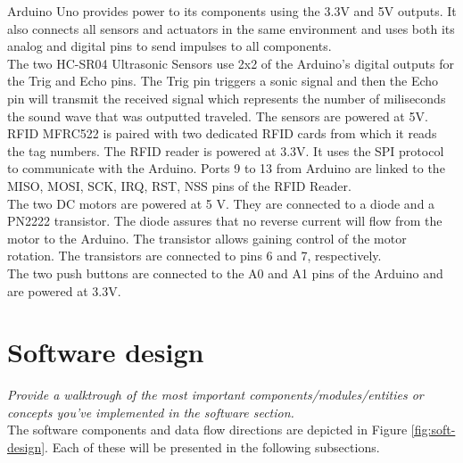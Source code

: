 \documentclass[a4paper,11pt]{article}
\begin{document}
Arduino Uno provides power to its components using the 3.3V and 5V outputs. It also connects all sensors and actuators in the same environment and uses both its analog and digital pins to send impulses to all components.\\

The two HC-SR04 Ultrasonic Sensors use 2x2 of the Arduino's digital outputs for the Trig and Echo pins. The Trig pin triggers a sonic signal and then the Echo pin will transmit the received signal which represents the number of miliseconds the sound wave that was outputted traveled. The sensors are powered at 5V.\\

RFID MFRC522 is paired with two dedicated RFID cards from which it reads the tag numbers. The RFID reader is powered at 3.3V. It uses the SPI protocol to communicate with the Arduino. Ports 9 to 13 from Arduino are linked to the MISO, MOSI, SCK, IRQ, RST, NSS pins of the RFID Reader.\\

The two DC motors are powered at 5 V. They are connected to a diode and a PN2222 transistor. The diode assures that no reverse current will flow from the motor to the Arduino. The transistor allows gaining control of the motor rotation. The transistors are connected to pins 6 and 7, respectively.\\

The two push buttons are connected to the A0 and A1 pins of the Arduino and are powered at 3.3V.\\

\section{Software design}
\textit{Provide a walktrough of the most important components/modules/entities or concepts you've implemented in the software section.}\\

The software components and data flow directions are depicted in Figure \ref{fig:soft-design}. Each of these will be presented in the following subsections.\\
\end{document}
